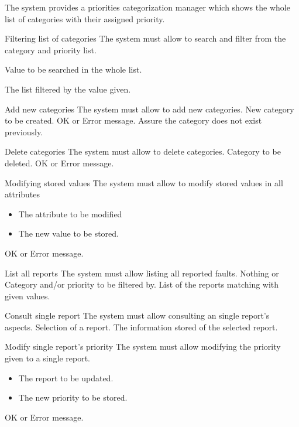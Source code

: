
The system provides a priorities categorization manager which shows the whole list of categories with their assigned priority. 

\begin{requirement}{Filtering list of categories}
\reqdesc The system must allow to search and filter from the category and priority list.

\reqin Value to be searched in the whole list.

\reqout The list filtered by the value given.
\end{requirement}


\begin{requirement}{Add new categories}
\reqdesc  The system must allow to add new categories.
\reqin New category to be created.
\reqout OK or Error message.
\reqsteps Assure the category does not exist previously.
\end{requirement}

\begin{requirement}{Delete categories}
\reqdesc  The system must allow to delete categories.
\reqin Category to be deleted.
\reqout OK or Error message.
\end{requirement}


\begin{requirement}{Modifying stored values}
\reqdesc The system must allow to modify stored values in all attributes
\reqin
\begin{itemize}
\item The attribute to be modified 
\item The new value to be stored.
\end{itemize}

\reqout OK or Error message.
\end{requirement}


\begin{requirement}{List all reports}
\reqdesc The system must allow listing all reported faults.
\reqin Nothing or Category and/or priority to be filtered by.
\reqout List of the reports matching with given values.
\end{requirement}

\begin{requirement}{Consult single report}
\reqdesc The system must allow consulting an single report's aspects.
\reqin Selection of a report.
\reqout The information stored of the selected report.
\end{requirement}

\begin{requirement}{Modify single report's priority}
\reqdesc The system must allow modifying the priority given to a single report.
\reqin \begin{itemize}
\item The report to be updated.
\item The new priority to be stored.
\end{itemize}
\reqout OK or Error message.

\end{requirement}




